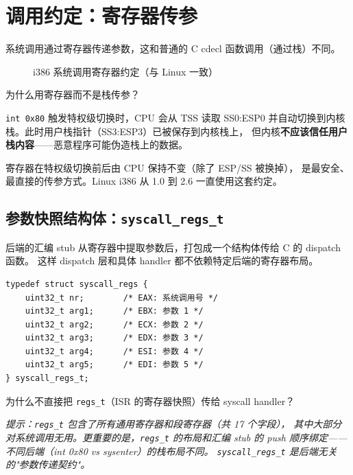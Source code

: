 \section{调用约定：寄存器传参}
\label{sec:syscall-convention}

系统调用通过寄存器传递参数，这和普通的 C cdecl 函数调用（通过栈）不同。

\begin{figure}[H]
  \centering
  
  \caption{i386 系统调用寄存器约定（与 Linux 一致）}
  \label{fig:syscall-regs}
\end{figure}

\begin{whybox}
为什么用寄存器而不是栈传参？

\texttt{int 0x80} 触发特权级切换时，CPU 会从 TSS 读取 SS0:ESP0
并自动切换到内核栈。此时用户栈指针（SS3:ESP3）已被保存到内核栈上，
但内核\textbf{不应该信任用户栈内容}——恶意程序可能伪造栈上的数据。

寄存器在特权级切换前后由 CPU 保持不变（除了 ESP/SS 被换掉），
是最安全、最直接的传参方式。Linux i386 从 1.0 到 2.6 一直使用这套约定。
\end{whybox}

\subsection{参数快照结构体：\texttt{syscall\_regs\_t}}

后端的汇编 stub 从寄存器中提取参数后，打包成一个结构体传给 C 的 dispatch 函数。
这样 dispatch 层和具体 handler 都不依赖特定后端的寄存器布局。

\begin{lstlisting}[style=cstyle]
typedef struct syscall_regs {
    uint32_t nr;        /* EAX: 系统调用号 */
    uint32_t arg1;      /* EBX: 参数 1 */
    uint32_t arg2;      /* ECX: 参数 2 */
    uint32_t arg3;      /* EDX: 参数 3 */
    uint32_t arg4;      /* ESI: 参数 4 */
    uint32_t arg5;      /* EDI: 参数 5 */
} syscall_regs_t;
\end{lstlisting}

\begin{thinkbox}
为什么不直接把 \texttt{regs\_t}（ISR 的寄存器快照）传给 syscall handler？

\emph{提示：\texttt{regs\_t} 包含了所有通用寄存器和段寄存器（共 17 个字段），
其中大部分对系统调用无用。更重要的是，\texttt{regs\_t} 的布局和汇编 stub 的
push 顺序绑定——不同后端（int 0x80 vs sysenter）的栈布局不同。
\texttt{syscall\_regs\_t} 是后端无关的"参数传递契约"。}
\end{thinkbox}

